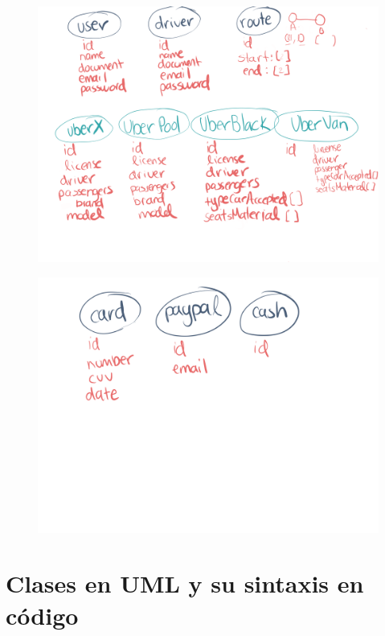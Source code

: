 \documentclass{article}
\begin{document}
\begin{figure}[h!]
  \centering
  \includegraphics[scale=0.08]{./Pictures/012_modelando_objetos_uber.png}
\end{figure}

\begin{figure}[h!]
  \centering
  \includegraphics[scale=0.08]{./Pictures/013_modelando_objetos_uber.png}
\end{figure}

\newpage
\section{Clases en UML y su sintaxis en código}%
\end{document}
